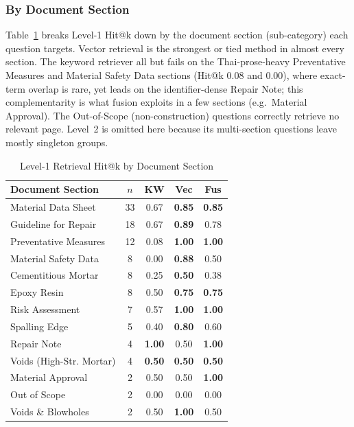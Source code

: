 \documentclass[10pt,a4paper,conference]{IEEEtran}
\begin{document}
\subsubsection{By Document Section}
Table~\ref{tab:retrsub} breaks Level-1 Hit@k down by the document section
(sub-category) each question targets. Vector retrieval is the strongest or tied
method in almost every section. The keyword retriever all but fails on the
Thai-prose-heavy Preventative Measures and Material Safety Data sections (Hit@k
$0.08$ and $0.00$), where exact-term overlap is rare, yet leads on the
identifier-dense Repair Note;
this complementarity is what fusion exploits in a few sections (e.g.\ Material
Approval). The Out-of-Scope (non-construction) questions correctly retrieve no
relevant page. Level~2 is omitted here because its multi-section questions leave
mostly singleton groups.

\begin{table}[htbp]
\caption{Level-1 Retrieval Hit@k by Document Section}
\begin{center}
\footnotesize
\begin{tabular}{|p{}|c|ccc|}
\hline
\textbf{Document Section} & \textbf{$n$} & \textbf{KW} & \textbf{Vec} & \textbf{Fus} \\
\hline
Material Data Sheet & 33 & 0.67 & \textbf{0.85} & \textbf{0.85} \\
\hline
Guideline for Repair & 18 & 0.67 & \textbf{0.89} & 0.78 \\
\hline
Preventative Measures & 12 & 0.08 & \textbf{1.00} & \textbf{1.00} \\
\hline
Material Safety Data & 8 & 0.00 & \textbf{0.88} & 0.50 \\
\hline
Cementitious Mortar & 8 & 0.25 & \textbf{0.50} & 0.38 \\
\hline
Epoxy Resin & 8 & 0.50 & \textbf{0.75} & \textbf{0.75} \\
\hline
Risk Assessment & 7 & 0.57 & \textbf{1.00} & \textbf{1.00} \\
\hline
Spalling Edge & 5 & 0.40 & \textbf{0.80} & 0.60 \\
\hline
Repair Note & 4 & \textbf{1.00} & 0.50 & \textbf{1.00} \\
\hline
Voids (High-Str. Mortar) & 4 & \textbf{0.50} & \textbf{0.50} & \textbf{0.50} \\
\hline
Material Approval & 2 & 0.50 & 0.50 & \textbf{1.00} \\
\hline
Out of Scope & 2 & 0.00 & 0.00 & 0.00 \\
\hline
Voids \& Blowholes & 2 & 0.50 & \textbf{1.00} & 0.50 \\
\hline
\end{tabular}
\label{tab:retrsub}
\end{center}
\end{table}
\end{document}
